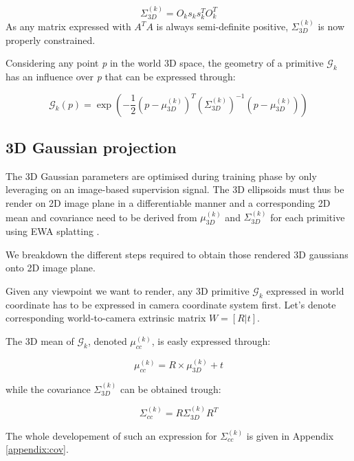 \begin{equation}
    \Sigma^{(k)}_{3D} = O_{k}s_{k}s_{k}^{T}O_{k}^{T}
\end{equation}
As any matrix expressed with $A^{T}A$ is always semi-definite positive, $\Sigma^{(k)}_{3D}$ is now properly constrained. 

Considering any point \textit{p} in the world 3D space, the geometry of a primitive $\mathcal{G}_{k}$ has an influence over \textit{p} that can be expressed through: 

\begin{equation}
  \mathcal{G}_{k}(p) = \exp \left(-\frac{1}{2}(p-\mu^{(k)}_{3D})^{T}(\Sigma^{(k)}_{3D})^{-1}(p-\mu^{(k)}_{3D})\right)
\end{equation}

\subsection{3D Gaussian projection} The 3D Gaussian parameters are optimised during training phase by only leveraging on an image-based supervision signal. The 3D ellipsoids must thus be render on 2D image plane in a differentiable manner and a corresponding 2D mean and covariance need to be derived from $\mu^{(k)}_{3D}$ and $\Sigma^{(k)}_{3D}$ for each primitive using EWA splatting \citep{zwicker2001ewa}. 

We breakdown the different steps required to obtain those rendered 3D gaussians onto 2D image plane. 

Given any viewpoint we want to render, any 3D primitive $\mathcal{G}_{k}$ expressed in world coordinate has to be expressed in camera coordinate system first. Let's denote corresponding world-to-camera extrinsic matrix $W=[R|t]$. 

The 3D mean of $\mathcal{G}_{k}$, denoted $\mu^{(k)}_{cc}$, is easly expressed through: 

\begin{equation}
  \mu^{(k)}_{cc} = R\times \mu^{(k)}_{3D}+t
\end{equation}

while the covariance $\Sigma^{(k)}_{3D}$ can be obtained trough: 

\begin{equation}
  \Sigma^{(k)}_{cc}= R\Sigma^{(k)}_{3D}R^{T}
  \label{eq:gs-3dcov-transfrom}
\end{equation}

The whole developement of such an expression for $\Sigma^{(k)}_{cc}$ is given in Appendix \ref{appendix:cov}. 

